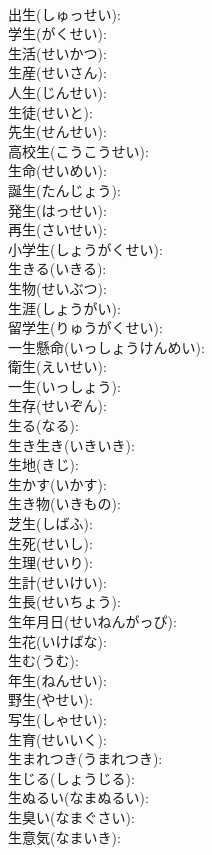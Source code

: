 \documentclass[8pt]{extreport}
\begin{document}
\begin{CJK}{UTF8}{min}
\\	出生(しゅっせい): 
\\	学生(がくせい): 
\\	生活(せいかつ): 
\\	生産(せいさん): 
\\	人生(じんせい): 
\\	生徒(せいと): 
\\	先生(せんせい): 
\\	高校生(こうこうせい): 
\\	生命(せいめい): 
\\	誕生(たんじょう): 
\\	発生(はっせい): 
\\	再生(さいせい): 
\\	小学生(しょうがくせい): 
\\	生きる(いきる): 
\\	生物(せいぶつ): 
\\	生涯(しょうがい): 
\\	留学生(りゅうがくせい): 
\\	一生懸命(いっしょうけんめい): 
\\	衛生(えいせい): 
\\	一生(いっしょう): 
\\	生存(せいぞん): 
\\	生る(なる): 
\\	生き生き(いきいき): 
\\	生地(きじ): 
\\	生かす(いかす): 
\\	生き物(いきもの): 
\\	芝生(しばふ): 
\\	生死(せいし): 
\\	生理(せいり): 
\\	生計(せいけい): 
\\	生長(せいちょう): 
\\	生年月日(せいねんがっぴ): 
\\	生花(いけばな): 
\\	生む(うむ): 
\\	年生(ねんせい): 
\\	野生(やせい): 
\\	写生(しゃせい): 
\\	生育(せいいく): 
\\	生まれつき(うまれつき): 
\\	生じる(しょうじる): 
\\	生ぬるい(なまぬるい): 
\\	生臭い(なまぐさい): 
\\	生意気(なまいき): 

\end{CJK}
\end{document}

